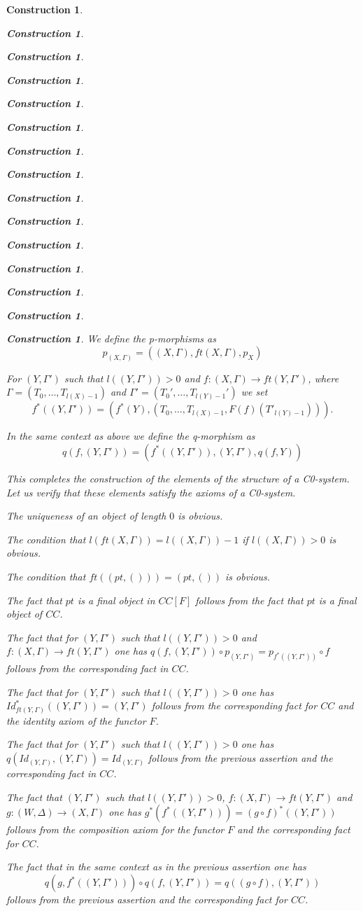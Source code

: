 \documentclass[12pt]{amsart}
\numberwithin{proposition}{subsection}
\newtheorem{construction}[proposition]{Construction}
\newcommand{\llabel}[1]{\label{#1}}
\newcommand{\sr}{\rightarrow}
\begin{document}
\begin{construction}
\begin{construction}
\begin{construction}
\begin{construction}
\begin{construction}
\begin{construction}
\begin{construction}
\begin{construction}
\begin{construction}
\begin{construction}
\begin{construction}
\begin{construction}
\begin{construction}
\begin{construction}
\begin{construction}
We define the p-morphisms as 
%
$$p_{(X,\Gamma)}=((X,\Gamma),ft(X,\Gamma), p_X)$$

For $(Y,\Gamma')$ such that $l((Y,\Gamma'))>0$ and $f:(X,\Gamma)\sr ft(Y,\Gamma')$, where $\Gamma=(T_0,\dots,T_{l(X)-1})$ and $\Gamma'=(T_0',\dots,T_{l(Y)-1}')$ we set
%
\begin{equation}\llabel{2016.01.31.eq1}
f^*((Y,\Gamma'))=(f^*(Y),(T_0,\dots,T_{l(X)-1},F(f)(T'_{l(Y)-1}))).
\end{equation}%
%

In the same context as above we define the q-morphism as
%
$$q(f,(Y,\Gamma'))=(f^*((Y,\Gamma')),(Y,\Gamma'),q(f,Y))$$

This completes the construction of the elements of the structure of a C0-system. Let us verify that these elements satisfy the axioms of a C0-system. 

The uniqueness of an object of length $0$ is obvious.

The condition that $l(ft(X,\Gamma))=l((X,\Gamma))-1$ if $l((X,\Gamma))>0$ is obvious.

The condition that $ft((pt,()))=(pt,())$ is obvious. 

The fact that $pt$ is a final object in $CC[F]$ follows from the fact that $pt$ is a final object of $CC$.

The fact that for $(Y,\Gamma')$ such that $l((Y,\Gamma'))>0$ and
$f:(X,\Gamma)\sr ft(Y,\Gamma')$ one has $q(f,(Y,\Gamma'))\circ
p_{(Y,\Gamma')}=p_{f^*((Y,\Gamma'))}\circ f$ follows from the corresponding
fact in $CC$.

The fact that for $(Y,\Gamma')$ such that $l((Y,\Gamma'))>0$ one has
$Id_{ft(Y,\Gamma)}^*((Y,\Gamma'))=(Y,\Gamma')$ follows from the corresponding
fact for $CC$ and the identity axiom of the functor $F$.

The fact that for $(Y,\Gamma')$ such that $l((Y,\Gamma'))>0$ one has
$q(Id_{(Y,\Gamma)},(Y,\Gamma))=Id_{(Y,\Gamma)}$ follows from the previous
assertion and the corresponding fact in $CC$.

The fact that $(Y,\Gamma')$ such that $l((Y,\Gamma'))>0$, $f:(X,\Gamma)\sr
ft(Y,\Gamma')$ and $g:(W,\Delta)\sr (X,\Gamma)$ one has
$g^*(f^*((Y,\Gamma')))=(g\circ f)^*((Y,\Gamma'))$ follows from the composition
axiom for the functor $F$ and the corresponding fact for $CC$.

The fact that in the same context as in the previous assertion one has
%
$$q(g,f^*((Y,\Gamma')))\circ q(f,(Y,\Gamma'))=q((g\circ f),(Y,\Gamma'))$$
%
follows from the previous assertion and the corresponding fact for $CC$. 


\end{construction}
\end{construction}
\end{construction}
\end{construction}
\end{construction}
\end{construction}
\end{construction}
\end{construction}
\end{construction}
\end{construction}
\end{construction}
\end{construction}
\end{construction}
\end{construction}
\end{construction}
\end{document}
